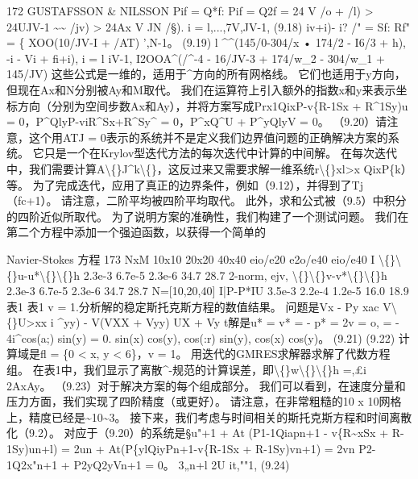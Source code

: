 \documentclass[UTF8,11pt,a4paper,openany,fontset=fandol]{ctexbook}
\begin{document}
172 GUSTAFSSON \& NILSSON Pif = Q*f: Pif = Q2f = 24 V /o + /l) > 24UJV-1 \textasciitilde{}\textasciitilde{} /jv) > 24Ax V JN /§). i = l,...,7V,JV-1, (9.18) iv+i)- i? /" = Sf: Rf" = \{ XOO(10/JV-I + /AT) ',N-1。 (9.19) l \textasciicircum{}\textasciicircum{}(145/0-304/x • 174/2 - I6/3 + h), -i - Vi + fi+i), i = l iV-1, I2OOA\textasciicircum{}(/\textasciicircum{}-4 - 16/JV-3 + 174/w\_2 - 304/w\_1 + 145/JV) 这些公式是一维的，适用于\textasciicircum{}方向的所有网格线。 它们也适用于y方向，但现在Ax和N分别被Ay和M取代。 我们在运算符上引入额外的指数x和y来表示坐标方向（分别为空间步数Ax和Ay），并将方案写成Prx1QixP-v\{R-1Sx + R\textasciicircum{}1Sy)u = 0，P\textasciicircum{}QlyP-viR\textasciicircum{}Sx+R\textasciicircum{}Sy\textasciicircum{} = 0，P\textasciicircum{}xQ\textasciicircum{}U + P\textasciicircum{}yQlyV = 0。 （9.20）请注意，这个用ATJ = 0表示的系统并不是定义我们边界值问题的正确解决方案的系统。 它只是一个在Krylov型迭代方法的每次迭代中计算的中间解。 在每次迭代中，我们需要计算A\textbackslash\{\}J\textasciicircum{}k\textbackslash\{\}，这反过来又需要求解一维系统r\textbackslash\{\}xl>x QixP\{k）等。 为了完成迭代，应用了真正的边界条件，例如（9.12），并得到了Tj（fc+1）。 请注意，二阶平均被四阶平均取代。 此外，求和公式被（9.5）中积分的四阶近似所取代。 为了说明方案的准确性，我们构建了一个测试问题。 我们在第二个方程中添加一个强迫函数，以获得一个简单的

Navier-Stokes 方程 173 NxM 10x10 20x20 40x40 eio/e20 e2o/e40 eio/e40 I \textbackslash\{\}\textbackslash\{\}u-u*\textbackslash\{\}\textbackslash\{\}h 2.3e-3 6.7e-5 2.3e-6 34.7 28.7 2-norm, ejv, \textbackslash\{\}\textbackslash\{\}v-v*\textbackslash\{\}\textbackslash\{\}h 2.3e-3 6.7e-5 2.3e-6 34.7 28.7 N=[10,20,40] I|P-P*IU 3.5e-3 2.2e-4 1.2e-5 16.0 18.9 表1 表1 v = 1.分析解的稳定斯托克斯方程的数值结果。 问题是Vx - Py xac V\textbackslash\{\}U>xx i \textasciicircum{}yy) - V(VXX + Vyy) UX + Vy t解是u* = v* = - p* = 2v = o, = - 4i\textasciicircum{}cos(a;) sin(y) = 0. sin(x) cos(y), cos(:r) sin(y), cos(x) cos(y)。 (9.21) (9.22) 计算域是fl = \{0 < x, y < 6\}，v = 1。 用迭代的GMRES求解器求解了代数方程组。 在表1中，我们显示了离散\textasciicircum{}-规范的计算误差，即\textbackslash\{\}w\textbackslash\{\}\textbackslash\{\}h =,£i 2AxAy。 （9.23）对于解决方案的每个组成部分。 我们可以看到，在速度分量和压力方面，我们实现了四阶精度（或更好）。 请注意，在非常粗糙的10 x 10网格上，精度已经是\textasciitilde{}10\textasciitilde{}3。 接下来，我们考虑与时间相关的斯托克斯方程和时间离散化（9.2）。 对应于（9.20）的系统是§u"+1 + At (P1-1Qiapn+1 - v\{R\textasciitilde{}xSx + R-1Sy)un+l) = 2un + At(P\{ylQiyPn+1-v\{R-1Sx + R-1Sy)vn+1) = 2vn P2-1Q2x"n+1 + P2yQ2yVn+1 = 0。 3„n+l 2U it,""1, (9.24)
\end{document}

